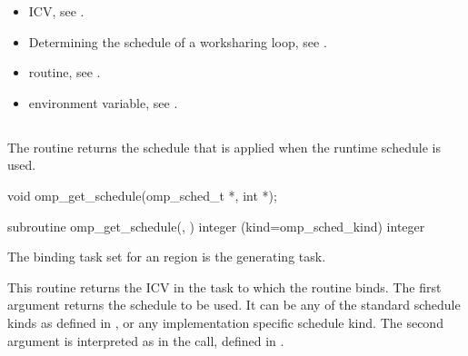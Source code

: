 \crossreferences
\begin{itemize}
\item {} ICV, see
.

\item Determining the schedule of a worksharing loop, see
.

\item {} routine, see
.

\item {} environment variable, see
.
\end{itemize}









\subsection{}
\label{subsec:omp_get_schedule}
\summary
The  routine returns the schedule that is applied when the
runtime schedule is used.
\format
\begin{ccppspecific}
\begin{ompcFunction}
void omp_get_schedule(omp_sched_t *, int *);
\end{ompcFunction}
\end{ccppspecific}


\begin{fortranspecific}
\begin{ompfSubroutine}
subroutine omp_get_schedule(, )
integer (kind=omp_sched_kind) 
integer 
\end{ompfSubroutine}
\end{fortranspecific}

\binding
The binding task set for an  region is the generating task.

\effect
This routine returns the  ICV in the task to which the routine binds. The
first argument  returns the schedule to be used. It can be any of the standard
schedule kinds as defined in
,
or any implementation specific
schedule kind. The second argument is interpreted as in the  call,
defined in
.

